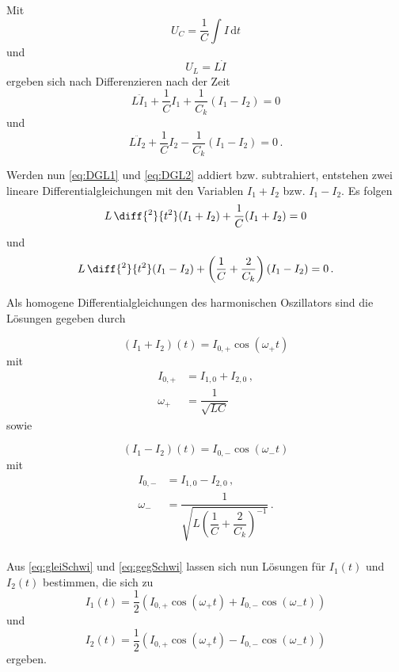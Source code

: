 Mit 
\begin{equation*}
    U_C = \dfrac{1}{C} \int I \, \text{d}t
\end{equation*}
und
\begin{equation*}
    U_L = L \dot{I}
\end{equation*}
ergeben sich nach Differenzieren nach der Zeit
\begin{equation}
    L\ddot{I}_1 + \dfrac{1}{C}I_1 + \dfrac{1}{C_k}(I_1 - I_2) = 0
    \label{eq:DGL1}
\end{equation}
und
\begin{equation}
    L\ddot{I}_2 + \dfrac{1}{C}I_2 - \dfrac{1}{C_k}(I_1 - I_2) = 0\,.
    \label{eq:DGL2}
\end{equation}

Werden nun \eqref{eq:DGL1} und \eqref{eq:DGL2} addiert bzw. subtrahiert, entstehen zwei lineare Differentialgleichungen mit den Variablen $I_1+I_2$ bzw. $I_1-I_2$.
Es folgen
\begin{equation}
    L \,\diff{^2}{t^2}(I_1+I_2) + \dfrac{1}{C}(I_1 + I_2) = 0
    \label{eq:addDGL}
\end{equation}
und
\begin{equation}
    L \,\diff{^2}{t^2}(I_1 - I_2) + \left(\dfrac{1}{C} + \dfrac{2}{C_k} \right)(I_1 - I_2) = 0\,.
\end{equation}

\newpage

Als homogene Differentialgleichungen des harmonischen Oszillators sind die Lösungen gegeben durch

\begin{equation}
    (I_1+I_2)(t) = I_{0,+} \cos(ω_+t)
    \label{eq:gleiSchwi}
\end{equation}
mit 
\begin{align*}
    I_{0,+} &= I_{1,0}+I_{2,0}\, , \\
    ω_+     &=\dfrac{1}{\sqrt{LC}}
\end{align*}
sowie

\begin{equation*}
    (I_1-I_2)(t) = I_{0,-}\cos(ω_-t)
    \label{eq:gegSchwi}
\end{equation*}
mit 
\begin{align*}
    I_{0,-} &=I_{1,0} - I_{2,0}\, , \\
    ω_-     &= \dfrac{1}{\sqrt{L \left(\dfrac{1}{C}+\dfrac{2}{C_k}\right)^{-1}}}\,.
\end{align*} \\

Aus \eqref{eq:gleiSchwi} und \eqref{eq:gegSchwi} lassen sich nun Lösungen für $I_1(t)$ und $I_2(t)$ bestimmen, die sich zu
\begin{equation}
    I_1(t) = \dfrac{1}{2}(I_{0,+}\cos(ω_+ t) + I_{0,-}\cos(ω_- t))
\end{equation}
und
\begin{equation}
    I_2(t) = \dfrac{1}{2}(I_{0,+}\cos(ω_+ t) - I_{0,-}\cos(ω_- t))
\end{equation}
ergeben. \\

